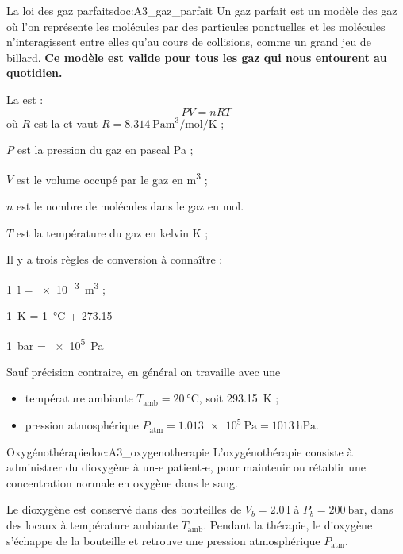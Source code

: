 \begin{doc}{La loi des gaz parfaits}{doc:A3_gaz_parfait}
  Un gaz parfait est un modèle des gaz où l'on représente les molécules par des particules ponctuelles et les molécules n'interagissent entre elles qu'au cours de collisions, comme un grand jeu de billard.
  \textbf{Ce modèle est valide pour tous les gaz qui nous entourent au quotidien.}
  
  \begin{encart}
    La  est :
    \begin{equation*}
      PV = nRT
    \end{equation*}
    où $R$ est la  et vaut $R = \qty{8,314}{\pascal \m\cubed \per\mole \per\kelvin}$ ;
    \begin{listePoints}
      \item $P$ est la pression du gaz en pascal \unit{\pascal} ;
      \item $V$ est le volume occupé par le gaz en \unit{\m\cubed} ;
      \item $n$ est le nombre de molécules dans le gaz en \unit{\mole}.
      \item $T$ est la température du gaz en kelvin \unit{\kelvin} ;
    \end{listePoints}
  \end{encart}

  Il y a trois règles de conversion à connaître :
  \begin{listePoints}
    \item \qty{1}{\litre} = \qty{e-3}{\m\cubed} ;
    \item \qty{1}{\kelvin} = \qty{1}{\degreeCelsius} + \num{273,15}
    \item \qty{1}{\bar} = \qty{e5}{\pascal}
  \end{listePoints}

  Sauf précision contraire, en général on travaille avec une
  \begin{itemize}
    \item température ambiante $T_\text{amb} = \qty{20}{\degreeCelsius}$, soit \qty{293,15}{\kelvin} ;
    \item pression atmosphérique $P_\text{atm} = \qty{1,013e5}{\pascal} = \qty{1013}{\hecto\pascal}$.
  \end{itemize}
  
  
\end{doc}


\begin{doc}{Oxygénothérapie}{doc:A3_oxygenotherapie}
  L'oxygénothérapie consiste à administrer du dioxygène à un-e patient-e, pour maintenir ou rétablir une concentration normale en oxygène dans le sang.

  Le dioxygène est conservé dans des bouteilles de $V_b = \qty{2,0}{\litre}$ à $P_b = \qty{200}{\bar}$, dans des locaux à température ambiante $T_\text{amb}$.
  Pendant la thérapie, le dioxygène s'échappe de la bouteille et retrouve une pression atmosphérique $P_\text{atm}$.
\end{doc}

